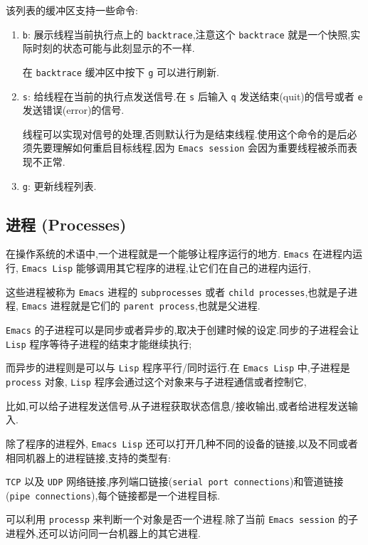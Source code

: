 \documentclass[11pt]{article}
\begin{document}
该列表的缓冲区支持一些命令:

\begin{enumerate}
\item \texttt{b}: 展示线程当前执行点上的 \texttt{backtrace},注意这个 \texttt{backtrace} 就是一个快照,实际时刻的状态可能与此刻显示的不一样.

在 \texttt{backtrace} 缓冲区中按下 \texttt{g} 可以进行刷新.

\item \texttt{s}: 给线程在当前的执行点发送信号.在 \texttt{s} 后输入 \texttt{q} 发送结束(quit)的信号或者 \texttt{e} 发送错误(error)的信号.

线程可以实现对信号的处理,否则默认行为是结束线程.使用这个命令的是后必须先要理解如何重启目标线程,因为 \texttt{Emacs session} 会因为重要线程被杀而表现不正常.

\item \texttt{g}: 更新线程列表.
\end{enumerate}


\subsection{进程 (Processes)}
\label{sec:org9f9b365}

在操作系统的术语中,一个进程就是一个能够让程序运行的地方. \texttt{Emacs} 在进程内运行, \texttt{Emacs Lisp} 能够调用其它程序的进程,让它们在自己的进程内运行,

这些进程被称为 \texttt{Emacs} 进程的 \texttt{subprocesses} 或者 \texttt{child processes},也就是子进程, \texttt{Emacs} 进程就是它们的 \texttt{parent process},也就是父进程.

\texttt{Emacs} 的子进程可以是同步或者异步的,取决于创建时候的设定.同步的子进程会让 \texttt{Lisp} 程序等待子进程的结束才能继续执行;

而异步的进程则是可以与 \texttt{Lisp} 程序平行/同时运行.在 \texttt{Emacs Lisp} 中,子进程是 \texttt{process} 对象, \texttt{Lisp} 程序会通过这个对象来与子进程通信或者控制它,

比如,可以给子进程发送信号,从子进程获取状态信息/接收输出,或者给进程发送输入.

除了程序的进程外, \texttt{Emacs Lisp} 还可以打开几种不同的设备的链接,以及不同或者相同机器上的进程链接,支持的类型有:

\texttt{TCP} 以及 \texttt{UDP} 网络链接,序列端口链接(\texttt{serial port connections})和管道链接(\texttt{pipe connections}),每个链接都是一个进程目标.

可以利用 \texttt{processp} 来判断一个对象是否一个进程.除了当前 \texttt{Emacs session} 的子进程外,还可以访问同一台机器上的其它进程.
\end{document}
